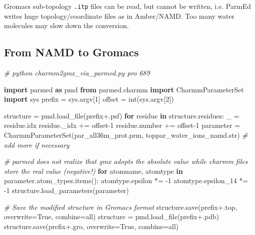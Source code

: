 \documentclass[
]{article}
\newenvironment{Shaded}{}{}
\newcommand{\BuiltInTok}[1]{\textcolor[rgb]{0.00,0.50,0.00}{#1}}
\newcommand{\CommentTok}[1]{\textcolor[rgb]{0.38,0.63,0.69}{\textit{#1}}}
\newcommand{\ControlFlowTok}[1]{\textcolor[rgb]{0.00,0.44,0.13}{\textbf{#1}}}
\newcommand{\DecValTok}[1]{\textcolor[rgb]{0.25,0.63,0.44}{#1}}
\newcommand{\ImportTok}[1]{\textcolor[rgb]{0.00,0.50,0.00}{\textbf{#1}}}
\newcommand{\KeywordTok}[1]{\textcolor[rgb]{0.00,0.44,0.13}{\textbf{#1}}}
\newcommand{\NormalTok}[1]{#1}
\newcommand{\OperatorTok}[1]{\textcolor[rgb]{0.40,0.40,0.40}{#1}}
\newcommand{\StringTok}[1]{\textcolor[rgb]{0.25,0.44,0.63}{#1}}
\newcommand{\VariableTok}[1]{\textcolor[rgb]{0.10,0.09,0.49}{#1}}
\begin{document}
Gromacs sub-topology \texttt{.itp} files can be read, but cannot be
written, i.e. ParmEd writes huge topology/coordinate files as in
Amber/NAMD. Too many water molecules may slow down the conversion.

\hypertarget{from-namd-to-gromacs}{%
\subsection{From NAMD to Gromacs}\label{from-namd-to-gromacs}}

\begin{Shaded}
\begin{Highlighting}[]
\CommentTok{\# python charmm2gmx\_via\_parmed.py pro 689}

\ImportTok{import}\NormalTok{ parmed }\ImportTok{as}\NormalTok{ pmd }
\ImportTok{from}\NormalTok{ parmed.charmm }\ImportTok{import}\NormalTok{ CharmmParameterSet}
\ImportTok{import}\NormalTok{ sys}
\NormalTok{prefix }\OperatorTok{=}\NormalTok{ sys.argv[}\DecValTok{1}\NormalTok{]}
\NormalTok{offset }\OperatorTok{=} \BuiltInTok{int}\NormalTok{(sys.argv[}\DecValTok{2}\NormalTok{])}

\NormalTok{structure }\OperatorTok{=}\NormalTok{ pmd.load\_file(prefix}\OperatorTok{+}\StringTok{\textquotesingle{}.psf\textquotesingle{}}\NormalTok{)}
\ControlFlowTok{for}\NormalTok{ residue }\KeywordTok{in}\NormalTok{ structure.residues:}
\NormalTok{    \_ }\OperatorTok{=}\NormalTok{ residue.idx}
\NormalTok{    residue.\_idx }\OperatorTok{+=}\NormalTok{ offset}\OperatorTok{{-}}\DecValTok{1}
\NormalTok{    residue.number }\OperatorTok{+=}\NormalTok{ offset}\OperatorTok{{-}}\DecValTok{1}
\NormalTok{parameter }\OperatorTok{=}\NormalTok{ CharmmParameterSet(}\StringTok{\textquotesingle{}par\_all36m\_prot.prm\textquotesingle{}}\NormalTok{, }\StringTok{\textquotesingle{}toppar\_water\_ions\_namd.str\textquotesingle{}}\NormalTok{)  }\CommentTok{\# add more if necessary}

\CommentTok{\# parmed does not realize that gmx adopts the absolute value while charmm files store the real value (negative!)}
\ControlFlowTok{for}\NormalTok{ atomname, atomtype }\KeywordTok{in}\NormalTok{ parameter.atom\_types.items():}
\NormalTok{    atomtype.epsilon }\OperatorTok{*=} \OperatorTok{{-}}\DecValTok{1}
\NormalTok{    atomtype.epsilon\_14 }\OperatorTok{*=} \OperatorTok{{-}}\DecValTok{1}
\NormalTok{structure.load\_parameters(parameter)}

\CommentTok{\# Save the modified structure in Gromacs format}
\NormalTok{structure.save(prefix}\OperatorTok{+}\StringTok{\textquotesingle{}.top\textquotesingle{}}\NormalTok{, overwrite}\OperatorTok{=}\VariableTok{True}\NormalTok{, combine}\OperatorTok{=}\StringTok{\textquotesingle{}all\textquotesingle{}}\NormalTok{)}
\NormalTok{structure }\OperatorTok{=}\NormalTok{ pmd.load\_file(prefix}\OperatorTok{+}\StringTok{\textquotesingle{}.pdb\textquotesingle{}}\NormalTok{)}
\NormalTok{structure.save(prefix}\OperatorTok{+}\StringTok{\textquotesingle{}.gro\textquotesingle{}}\NormalTok{, overwrite}\OperatorTok{=}\VariableTok{True}\NormalTok{, combine}\OperatorTok{=}\StringTok{\textquotesingle{}all\textquotesingle{}}\NormalTok{)}
\end{Highlighting}
\end{Shaded}
\end{document}
